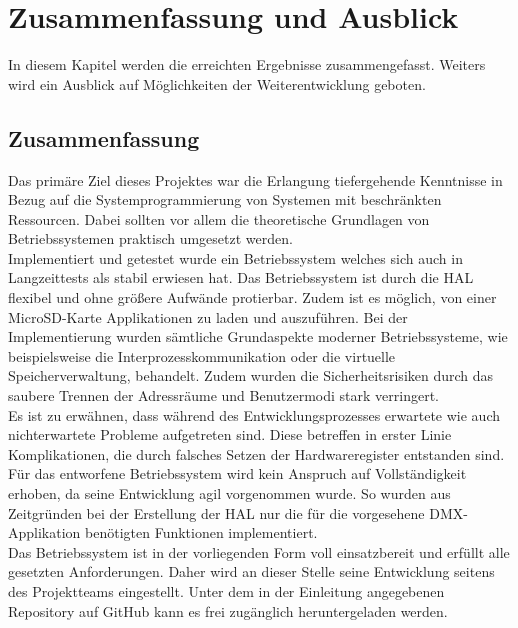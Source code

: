 \section{Zusammenfassung und Ausblick}

In diesem Kapitel werden die erreichten Ergebnisse zusammengefasst. Weiters wird ein Ausblick auf Möglichkeiten der Weiterentwicklung geboten.

\subsection{Zusammenfassung}

Das primäre Ziel dieses Projektes war die Erlangung tiefergehende Kenntnisse in Bezug auf die Systemprogrammierung von Systemen mit beschränkten Ressourcen. Dabei sollten vor allem die theoretische Grundlagen von Betriebssystemen praktisch umgesetzt werden. \\
 
Implementiert und getestet wurde ein Betriebssystem welches sich auch in Langzeittests als stabil erwiesen hat. Das Betriebssystem ist durch die HAL flexibel und ohne größere Aufwände protierbar. Zudem ist es möglich, von einer MicroSD-Karte Applikationen zu laden und auszuführen. 
Bei der Implementierung wurden sämtliche Grundaspekte moderner Betriebssysteme, wie beispielsweise die Interprozesskommunikation oder die virtuelle Speicherverwaltung, behandelt. Zudem wurden die Sicherheitsrisiken durch das saubere Trennen der Adressräume und Benutzermodi stark verringert. \\
 
Es ist zu erwähnen, dass während des Entwicklungsprozesses erwartete wie auch nichterwartete Probleme aufgetreten sind. Diese betreffen in erster Linie Komplikationen, die durch falsches Setzen der Hardwareregister entstanden sind. \\
 
Für das entworfene Betriebssystem wird kein Anspruch auf Vollständigkeit erhoben, da seine Entwicklung agil vorgenommen wurde. So wurden aus Zeitgründen bei der Erstellung der HAL nur die für die vorgesehene DMX-Applikation benötigten Funktionen implementiert. \\
 
Das Betriebssystem ist in der vorliegenden Form voll einsatzbereit und erfüllt alle gesetzten Anforderungen. Daher wird an dieser Stelle seine Entwicklung seitens des Projektteams eingestellt. Unter dem in der Einleitung angegebenen Repository auf GitHub kann es frei zugänglich heruntergeladen werden. \\